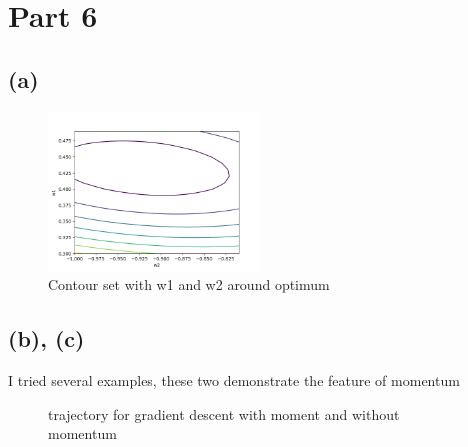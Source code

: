 \documentclass[12pt]{article}
\begin{document}
\section*{Part 6}
\subsection*{(a)}
\begin{figure}[h]
    \includegraphics[width=0.5\textwidth]{./report/part6a_contour.png}
    \caption{Contour set with w1 and w2 around optimum}
\end{figure}

\subsection*{(b), (c)}
I tried several examples, these two demonstrate the feature of momentum
\begin{figure}[H]
    \qquad
    \caption{trajectory for gradient descent with moment and without momentum}
\end{figure}
\end{document}
